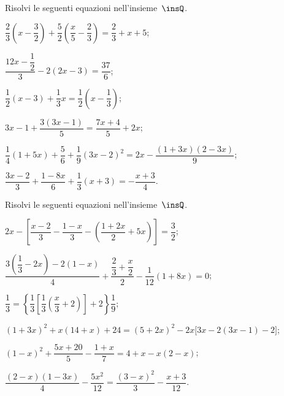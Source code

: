\pagebreak

\begin{esercizio}[\Ast] %
\label{ese:15.37}
Risolvi le seguenti equazioni nell'insieme~$\insQ$.
\begin{enumeratea}
 \item $\dfrac{2}{3}\left(x-\dfrac{3}{2}\right)+\dfrac{5}{2}\left(\dfrac{x}{5}-\dfrac{2}{3}\right)=\dfrac{2}{3}+x+5$;
 \item $\dfrac{12x-\dfrac{1}{2}}{3}-2(2x-3)=\dfrac{37}{6}$;
 \item $\dfrac{1}{2}(x-3)+\dfrac{1}{3}x=\dfrac{1}{2}\left(x-\dfrac{1}{3}\right)$;
 \item $3x-1+\dfrac{3(3x-1)}{5}=\dfrac{7x+4}{5}+2x$;
 \item $\dfrac{1}{4}(1+5x)+\dfrac{5}{6}+\dfrac{1}{9}(3x-2)^{2}=2x-\dfrac{(1+3x)(2-3x)}{9}$;
 \item $\dfrac{3x-2}{3}+\dfrac{1-8x}{6}+\dfrac{1}{3}(x+3)=-\dfrac{x+3}{4}$.
\end{enumeratea}
\end{esercizio}

\begin{esercizio}[\Ast] %
\label{ese:15.38}
Risolvi le seguenti equazioni nell'insieme~$\insQ$.
\begin{enumeratea}
 \item $2x-\left[\dfrac{x-2}{3}-\dfrac{1-x}{3}-\left(\dfrac{1+2x}{2}+5x\right)\right]=\dfrac{3}{2}$;
 \item $\dfrac{3\left(\dfrac{1}{3}-2x\right)-2(1-x)}{4}+\dfrac{\dfrac{2}{3}+\dfrac{x}{2}}{2}-\dfrac{1}{12}(1+8x)=0$;
 \item $\dfrac{1}{3}=\left\lbrace\dfrac{1}{3}\left[\dfrac{1}{3}\left(\dfrac{x}{3}+2\right)\right]+2 \right\rbrace\dfrac{1}{9}$;
 \item $(1+3x)^{2}+x(14+x)+24=(5+2x)^{2}-2x\big[3x-2(3x-1)-2\big]$;
 \item $(1-x)^{2}+\dfrac{5x+20}{5}-\dfrac{1+x}{7}=4+x-x(2-x)$;
 \item $\dfrac{(2-x)(1-3x)}{4}-\dfrac{5x^{2}}{12}=\dfrac{(3-x)^{2}}{3}-\dfrac{x+3}{12}$.
\end{enumeratea}
\end{esercizio}

